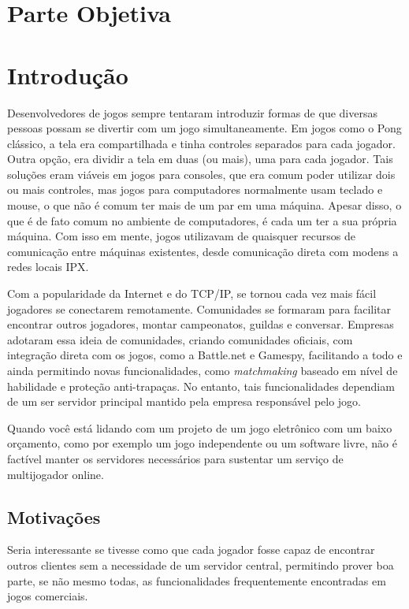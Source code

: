 \chapter*{Parte Objetiva}
\label{sec:parte_objetiva}
\chapter{Introdução}
\label{sec:intr}

Desenvolvedores de jogos sempre tentaram introduzir formas de que diversas
pessoas possam se divertir com um jogo simultaneamente. Em jogos como o Pong
clássico, a tela era compartilhada e tinha controles separados para cada
jogador. Outra opção, era dividir a tela em duas (ou mais), uma para cada
jogador. Tais soluções eram viáveis em jogos para consoles, que era comum poder
utilizar dois ou mais controles, mas jogos para computadores normalmente usam
teclado e mouse, o que não é comum ter mais de um par em uma máquina.
Apesar disso, o que é de fato comum no ambiente de computadores, é cada um ter
a sua própria máquina. Com isso em mente, jogos utilizavam de quaisquer recursos
de comunicação entre máquinas existentes, desde comunicação direta com modens
a redes locais IPX.

Com a popularidade da Internet e do TCP/IP, se tornou cada vez mais fácil
jogadores se conectarem remotamente. Comunidades se formaram para facilitar
encontrar outros jogadores, montar campeonatos, guildas e conversar. Empresas
adotaram essa ideia de comunidades, criando comunidades oficiais, com integração
direta com os jogos, como a Battle.net e Gamespy, facilitando a todo e ainda
permitindo novas funcionalidades, como \textit{matchmaking} baseado em nível de
habilidade e proteção anti-trapaças. No entanto, tais funcionalidades dependiam
de um ser servidor principal mantido pela empresa responsável pelo jogo.

Quando você está lidando com um projeto de um jogo eletrônico com um baixo
orçamento, como por exemplo um jogo independente ou um software livre, não é
factível manter os servidores necessários para sustentar um serviço de
multijogador online.

\section{Motivações}
\label{sec:intr:motivacoes}

Seria interessante se tivesse como que cada jogador fosse capaz de encontrar
outros clientes sem a necessidade de um servidor central, permitindo prover
boa parte, se não mesmo todas, as funcionalidades frequentemente encontradas
em jogos comerciais.

